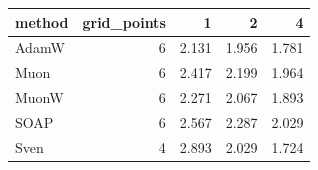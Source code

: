 \begin{tabular}{lrrrr}
\toprule
method & grid\_points & 1 & 2 & 4 \\
\midrule
AdamW & 6 & 2.131 & 1.956 & 1.781 \\
Muon & 6 & 2.417 & 2.199 & 1.964 \\
MuonW & 6 & 2.271 & 2.067 & 1.893 \\
SOAP & 6 & 2.567 & 2.287 & 2.029 \\
Sven & 4 & 2.893 & 2.029 & 1.724 \\
\bottomrule
\end{tabular}

